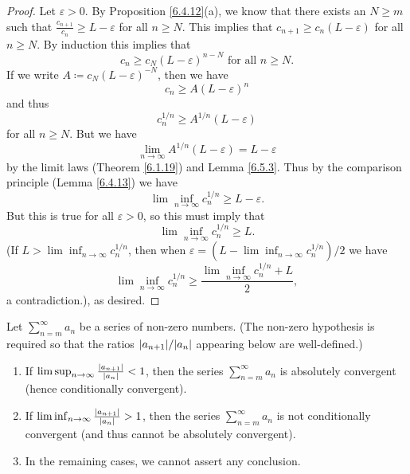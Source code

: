 \begin{proof}
    Let \(\varepsilon > 0\).
    By Proposition \ref{6.4.12}(a), we know that there exists an \(N \geq m\) such that \(\frac{c_{n + 1}}{c_n} \geq L - \varepsilon\) for all \(n \geq N\).
    This implies that \(c_{n + 1} \geq c_n (L - \varepsilon)\) for all \(n \geq N\).
    By induction this implies that
    \[
        c_n \geq c_N (L - \varepsilon)^{n - N} \text{ for all } n \geq N.
    \]
    If we write \(A \coloneqq c_N (L - \varepsilon)^{-N}\), then we have
    \[
        c_n \geq A(L - \varepsilon)^n
    \]
    and thus
    \[
        c_n^{1 / n} \geq A^{1 / n} (L - \varepsilon)
    \]
    for all \(n \geq N\).
    But we have
    \[
        \lim_{n \to \infty} A^{1 / n} (L - \varepsilon) = L - \varepsilon
    \]
    by the limit laws (Theorem \ref{6.1.19}) and Lemma \ref{6.5.3}.
    Thus by the comparison principle (Lemma \ref{6.4.13}) we have
    \[
        \lim\inf_{n \to \infty} c_n^{1 / n} \geq L - \varepsilon.
    \]
    But this is true for all \(\varepsilon > 0\), so this must imply that
    \[
        \lim\inf_{n \to \infty} c_n^{1 / n} \geq L.
    \]
    (If \(L > \lim\inf_{n \to \infty} c_n^{1 / n}\), then when \(\varepsilon = (L - \lim\inf_{n \to \infty} c_n^{1 / n}) / 2\) we have
    \[
        \lim\inf_{n \to \infty} c_n^{1 / n} \geq \frac{\lim\inf_{n \to \infty} c_n^{1 / n} + L}{2},
    \]
    a contradiction.), as desired.
\end{proof}

\begin{corollary}\label{7.5.3}
    Let \(\sum_{n = m}^\infty a_n\) be a series of non-zero numbers.
    (The non-zero hypothesis is required so that the ratios \(\abs*{a_{n + 1}} / \abs*{a_n}\) appearing below are well-defined.)
    \begin{enumerate}
        \item If \(\lim\sup_{n \to \infty} \frac{\abs*{a_{n + 1}}}{\abs*{a_n}} < 1\), then the series \(\sum_{n = m}^\infty a_n\) is absolutely convergent (hence conditionally convergent).
        \item If \(\lim\inf_{n \to \infty} \frac{\abs*{a_{n + 1}}}{\abs*{a_n}} > 1\), then the series \(\sum_{n = m}^\infty a_n\) is not conditionally convergent (and thus cannot be absolutely convergent).
        \item In the remaining cases, we cannot assert any conclusion.
    \end{enumerate}
\end{corollary}


